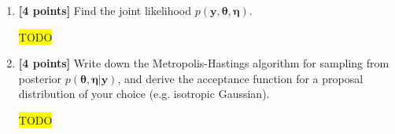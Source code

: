\documentclass[10pt]{article}
\newcommand{\hilight}[1]{\colorbox{yellow}{#1}}
\begin{document}
\begin{enumerate}
    \item \textbf{[4 points]} Find the joint likelihood $p(\mathbf{y},\boldsymbol{\theta},\boldsymbol{\eta})$.

\begin{solution}
\hilight{TODO}
\end{solution}

    \vspace{10mm}
    \item \textbf{[4 points]} Write down the Metropolis-Hastings algorithm for sampling from posterior $p(\boldsymbol{\theta},\boldsymbol{\eta}|\mathbf{y})$, and derive the acceptance function for a proposal distribution of your choice (e.g. isotropic Gaussian).

\begin{solution}
\hilight{TODO}
\end{solution}


\end{enumerate}
\end{document}
